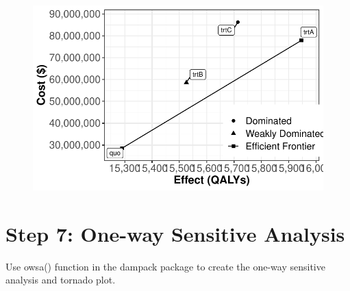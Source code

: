 \documentclass[
  letterpaper,
  DIV=11,
  numbers=noendperiod,
  oneside]{scrartcl}
\begin{document}
\begin{figure}[H]

{\centering \includegraphics{MarkovDA_files/figure-pdf/cea-output-1.pdf}

}

\end{figure}

\hypertarget{step-7-one-way-sensitive-analysis}{%
\section{Step 7: One-way Sensitive
Analysis}\label{step-7-one-way-sensitive-analysis}}

Use owsa() function in the dampack package to create the one-way
sensitive analysis and tornado plot.
\end{document}
